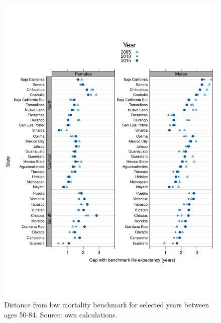 \documentclass[11.5pt]{article}
\begin{document}
{\begin{figure}
\centering
\caption{Distance from low mortality benchmark for selected years between ages 50-84. Source: own calculations.}
\begin{center}
\includegraphics[scale=.5]{Distance_oa.pdf}
\end{center}
\end{figure}






}
\end{document}
